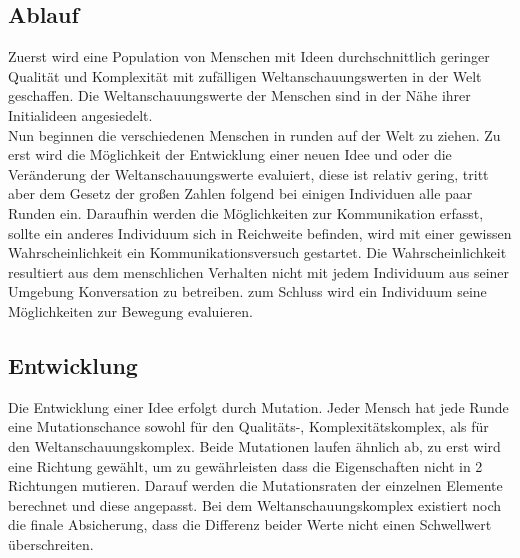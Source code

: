 \subsection{Ablauf}
Zuerst wird eine Population von Menschen mit Ideen durchschnittlich geringer Qualität und Komplexität mit zufälligen Weltanschauungswerten in der Welt geschaffen. 
Die Weltanschauungswerte der Menschen sind in der Nähe ihrer Initialideen angesiedelt. \\
Nun beginnen die verschiedenen Menschen in runden auf der Welt zu ziehen. 
Zu erst wird die Möglichkeit der Entwicklung einer neuen Idee und oder die Veränderung der Weltanschauungswerte evaluiert, diese ist relativ gering, tritt aber dem Gesetz der großen Zahlen folgend bei einigen Individuen alle paar Runden ein. 
Daraufhin werden die Möglichkeiten zur Kommunikation erfasst, sollte ein anderes Individuum sich in Reichweite befinden, wird mit einer gewissen Wahrscheinlichkeit ein Kommunikationsversuch gestartet. 
Die Wahrscheinlichkeit resultiert aus dem menschlichen Verhalten nicht mit jedem Individuum aus seiner Umgebung Konversation zu betreiben.
zum Schluss wird ein Individuum seine Möglichkeiten zur Bewegung evaluieren.

\subsection{Entwicklung}
Die Entwicklung einer Idee erfolgt durch Mutation.
Jeder Mensch hat jede Runde eine Mutationschance sowohl für den Qualitäts-, Komplexitätskomplex, als für den Weltanschauungskomplex.
Beide Mutationen laufen ähnlich ab, zu erst wird eine Richtung gewählt, um zu gewährleisten dass die Eigenschaften nicht in 2 Richtungen mutieren. 
Darauf werden die Mutationsraten der einzelnen Elemente berechnet und diese angepasst.
Bei dem Weltanschauungskomplex existiert noch die finale Absicherung, dass die Differenz beider Werte nicht einen Schwellwert überschreiten.

